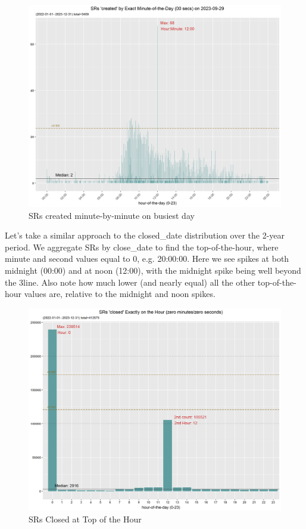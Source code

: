 \documentclass[12pt, titlepage]{article}
\begin{document}
{	\begin{figure}[H]
		 \centering
		 \includegraphics[width=\textwidth]{SR_created_by_minute_of_busiest_day.png}
		 \caption{SRs created minute-by-minute on busiest day}
		 \label{fig:busiestcreated}
	\end{figure}	

	Let's take a similar approach to the closed\_date distribution over the 2-year period. We aggregate 
	SRs by close\_date to find the top-of-the-hour, where minute and second values equal to 0, e.g. 20:00:00. 
	Here we see spikes at both midnight (00:00) and at noon (12:00), with the midnight spike being 
	well beyond the 3\textsigma line. Also note how much lower (and nearly equal) all the other
	top-of-the-hour values are, relative to the midnight and noon spikes. 
	
	\begin{figure}[H]
		 \centering
		 \includegraphics[width = \textwidth]{SR_closed_by_top_of_hour.png}
		 \caption{SRs Closed at Top of the Hour}
		 \label{fig:tophourclosed}
	\end{figure}
	
}
\end{document}
